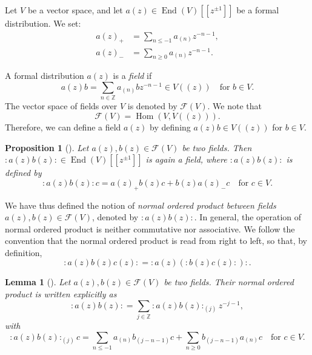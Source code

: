 \documentclass[a4paper, 12pt, reqno]{amsart}
\newtheorem{lemma}[theorem]{Lemma}
\newtheorem{proposition}[theorem]{Proposition}
\theoremstyle{remark}
\DeclareMathOperator{\Hom}{Hom}
\DeclareMathOperator{\End}{End}
\begin{document}
Let $V$ be a vector space, and let $a(z) \in \End(V)[[z^{\pm1}]]$ be a formal distribution.
We set:
\begin{align*}
  a(z)_+ &= \sum_{n \le -1}a_{(n)}z^{-n - 1}, \\
  a(z)_- &= \sum_{n \ge 0}a_{(n)}z^{-n - 1}.
\end{align*}

A formal distribution $a(z)$ is a \emph{field} if
\begin{equation*}
  a(z)b = \sum_{n \in \mathbb{Z}}a_{(n)}bz^{-n - 1} \in V((z)) \quad \text{for $b \in V$}.
\end{equation*}
The vector space of fields over $V$ is denoted by $\mathcal{F}(V)$.
We note that
\begin{equation*}
  \mathcal{F}(V) = \Hom(V, V((z))).
\end{equation*}
Therefore, we can define a field $a(z)$ by defining $a(z)b \in V((z))$ for $b \in V$.

\begin{proposition}[{\cite[Proposition 3.3.2]{nozaradan_introduction_2008}}]
  \label{prp:2}
  Let $a(z), b(z) \in \mathcal{F}(V)$ be two fields.
  Then $:a(z)b(z): \in \End(V)[[z^{\pm1}]]$ is again a field, where $:a(z)b(z):$ is defined by
  \begin{equation*}
    :a(z)b(z):c = a(z)_+b(z)c + b(z)a(z)_-c \quad \text{for $c \in V$}.
  \end{equation*}
\end{proposition}

We have thus defined the notion of \emph{normal ordered product between fields $a(z), b(z) \in \mathcal{F}(V)$}, denoted by $:a(z)b(z):$.
In general, the operation of normal ordered product is neither commutative nor associative.
We follow the convention that the normal ordered product is read from right to left, so that, by definition,
\begin{equation*}
  :a(z)b(z)c(z): = :a(z)(:b(z)c(z):):.
\end{equation*}

\begin{lemma}[{\cite[Proposition 3.3.3]{nozaradan_introduction_2008}}]
  \label{lmm:1}
  Let $a(z), b(z) \in \mathcal{F}(V)$ be two fields.
  Their normal ordered product is written explicitly as
  \begin{equation*}
    :a(z)b(z): = \sum_{j \in \mathbb{Z}}:a(z)b(z):_{(j)}z^{-j - 1},
  \end{equation*}
  with
  \begin{equation*}
    :a(z)b(z):_{(j)}c = \sum_{n \le -1}a_{(n)}b_{(j - n - 1)}c + \sum_{n \ge 0}b_{(j - n - 1)}a_{(n)}c \quad \text{for $c \in V$}.
  \end{equation*}
\end{lemma}
\end{document}
